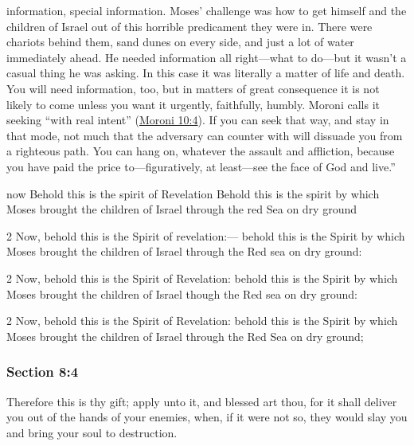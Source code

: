 {information, special information. Moses' challenge was how to get himself and the children of Israel out of this horrible predicament they were in. There were chariots behind them, sand dunes on every side, and just a lot of water immediately ahead. He needed information all right---what to do---but it wasn't a casual thing he was asking. In this case it was literally a matter of life and death. You will need information, too, but in matters of great consequence it is not likely to come unless you want it urgently, faithfully, humbly. Moroni calls it seeking ``with real intent'' (\hyperref[MORONI-10-4]{Moroni 10:4}). If you can seek that way, and stay in that mode, not much that the adversary can counter with will dissuade you from a righteous path. You can hang on, whatever the assault and affliction, because you have paid the price to---figuratively, at least---see the face of God and live.''
				}

		\begin{framed}
		\scriptsize
			\begin{compactdesc}
				\item[JSP] now Behold this is the spirit of Revelation Behold this is the spirit by which Moses brought the children of Israel through the red Sea on dry ground
				\item[BC] 2 Now, behold this is the Spirit of revelation:--- behold this is the Spirit by which Moses brought the children of Israel through the Red sea on dry ground:
				\item[DC 1835] 2 Now, behold this is the Spirit of Revelation: behold this is the Spirit by which Moses brought the children of Israel though the Red sea on dry ground:
				\item[DC 1844] 2 Now, behold this is the Spirit of Revelation: behold this is the Spirit by which Moses brought the children of Israel through the Red Sea on dry ground;
			\end{compactdesc}
		\end{framed}

	\subsubsection{Section 8:4} %
		\label{DC8-4}

		Therefore this is thy gift; apply unto it, and blessed art thou, for it shall deliver you out of the hands of your enemies, when, if it were not so, they would slay you and bring your soul to destruction.

